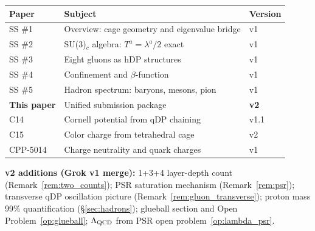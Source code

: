 \documentclass[11pt,a4paper]{article}
\begin{document}
\begin{table}[H]
\centering
\begin{tabular}{@{}lll@{}}
\toprule
Paper & Subject & Version \\
\midrule
SS \#1 \citep{cpp_ss1} & Overview: cage geometry and eigenvalue bridge & v1 \\
SS \#2 \citep{cpp_ss2} & SU(3)$_c$ algebra: $T^a=\lambda^a/2$ exact & v1 \\
SS \#3 \citep{cpp_ss3} & Eight gluons as hDP structures & v1 \\
SS \#4 \citep{cpp_ss4} & Confinement and $\beta$-function & v1 \\
SS \#5 \citep{cpp_ss5} & Hadron spectrum: baryons, mesons, pion & v1 \\
\textbf{This paper} & Unified submission package & \textbf{v2} \\
\midrule
C14 \citep{c14} & Cornell potential from qDP chaining & v1.1 \\
C15 \citep{c15} & Color charge from tetrahedral cage & v2 \\
CPP-5014 \citep{cpp5014} & Charge neutrality and quark charges & v1 \\
\bottomrule
\end{tabular}
\end{table}
\smallskip
\noindent\textbf{v2 additions (Grok v1 merge):} 1+3+4 layer-depth
count (Remark~\ref{rem:two_counts}); PSR saturation mechanism
(Remark~\ref{rem:psr}); transverse qDP oscillation picture
(Remark~\ref{rem:gluon_transverse}); proton mass 99\% quantification
(\S\ref{sec:hadrons}); glueball section and Open
Problem~\ref{op:glueball}; $\Lambda_{\rm QCD}$ from PSR open
problem~\ref{op:lambda_psr}.
\end{document}
